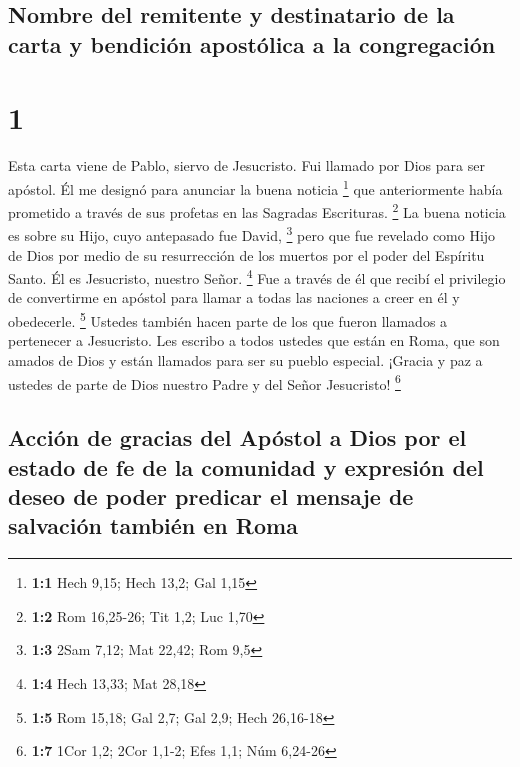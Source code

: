 \hypertarget{nombre-del-remitente-y-destinatario-de-la-carta-y-bendiciuxf3n-apostuxf3lica-a-la-congregaciuxf3n}{%
\subsection{Nombre del remitente y destinatario de la carta y bendición
apostólica a la
congregación}\label{nombre-del-remitente-y-destinatario-de-la-carta-y-bendiciuxf3n-apostuxf3lica-a-la-congregaciuxf3n}}

\hypertarget{section}{%
\section{1}\label{section}}

 Esta carta viene de Pablo, siervo de Jesucristo. Fui
llamado por Dios para ser apóstol. Él me designó para anunciar la buena
noticia \footnote{\textbf{1:1} Hech 9,15; Hech 13,2; Gal 1,15}
 que anteriormente había prometido a través de sus
profetas en las Sagradas Escrituras. \footnote{\textbf{1:2} Rom
  16,25-26; Tit 1,2; Luc 1,70}  La buena noticia es sobre
su Hijo, cuyo antepasado fue David, \footnote{\textbf{1:3} 2Sam 7,12;
  Mat 22,42; Rom 9,5}  pero que fue revelado como Hijo de
Dios por medio de su resurrección de los muertos por el poder del
Espíritu Santo. Él es Jesucristo, nuestro Señor. \footnote{\textbf{1:4}
  Hech 13,33; Mat 28,18}  Fue a través de él que recibí el
privilegio de convertirme en apóstol para llamar a todas las naciones a
creer en él y obedecerle. \footnote{\textbf{1:5} Rom 15,18; Gal 2,7; Gal
  2,9; Hech 26,16-18}  Ustedes también hacen parte de los
que fueron llamados a pertenecer a Jesucristo.  Les
escribo a todos ustedes que están en Roma, que son amados de Dios y
están llamados para ser su pueblo especial. ¡Gracia y paz a ustedes de
parte de Dios nuestro Padre y del Señor Jesucristo! \footnote{\textbf{1:7}
  1Cor 1,2; 2Cor 1,1-2; Efes 1,1; Núm 6,24-26}

\hypertarget{acciuxf3n-de-gracias-del-apuxf3stol-a-dios-por-el-estado-de-fe-de-la-comunidad-y-expresiuxf3n-del-deseo-de-poder-predicar-el-mensaje-de-salvaciuxf3n-tambiuxe9n-en-roma}{%
\subsection{Acción de gracias del Apóstol a Dios por el estado de fe de
la comunidad y expresión del deseo de poder predicar el mensaje de
salvación también en
Roma}\label{acciuxf3n-de-gracias-del-apuxf3stol-a-dios-por-el-estado-de-fe-de-la-comunidad-y-expresiuxf3n-del-deseo-de-poder-predicar-el-mensaje-de-salvaciuxf3n-tambiuxe9n-en-roma}}

